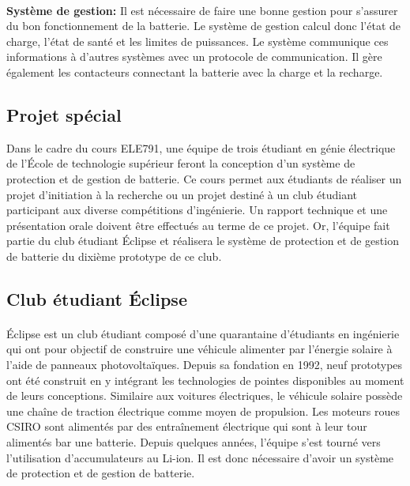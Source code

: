 			
			\paragraph{}
			\textbf{Système de gestion:} Il est nécessaire de faire une bonne gestion pour s'assurer du bon fonctionnement de la batterie. Le système de gestion calcul donc l'état de charge, l'état de santé et les limites de puissances. Le système communique ces informations à d'autres systèmes avec un protocole de communication. Il gère également les contacteurs connectant la batterie avec la charge et la recharge.
		
	
	\subsection{Projet spécial}
	Dans le cadre du cours ELE791, une équipe de trois étudiant en génie électrique de l'École de technologie supérieur feront la conception d'un système de protection et de gestion de batterie. Ce cours permet aux étudiants de réaliser un projet d'initiation à la recherche ou un projet destiné à un club étudiant participant aux diverse compétitions d'ingénierie. Un rapport technique et une présentation orale doivent être effectués au terme de ce projet. Or, l'équipe fait partie du club étudiant Éclipse et réalisera le système de protection et de gestion de batterie du dixième prototype de ce club.
	
		
	\subsection{Club étudiant Éclipse}
	
		\paragraph{}
		Éclipse est un club étudiant composé d'une quarantaine d'étudiants en ingénierie qui ont pour objectif de construire une véhicule alimenter par l'énergie solaire à l'aide de panneaux photovoltaïques. Depuis sa fondation en 1992, neuf prototypes ont été construit en y intégrant les technologies de pointes disponibles au moment de leurs conceptions. Similaire aux voitures électriques, le véhicule solaire possède une chaîne de traction électrique comme moyen de propulsion. Les moteurs roues  CSIRO sont alimentés par des entraînement électrique qui sont à leur tour alimentés bar une batterie. Depuis quelques années, l'équipe s'est tourné vers l'utilisation d'accumulateurs au Li-ion. Il est donc nécessaire d'avoir un système de protection et de gestion de batterie.
		
